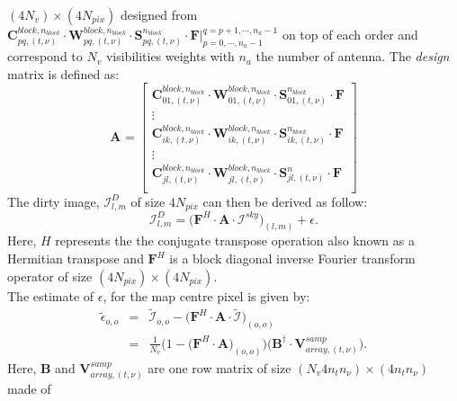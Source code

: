 \documentclass[useAMS,usenatbib]{mn2e}
\begin{document}
$(4N_v)\times (4N_{pix})$ designed from $\mathbf{C}_{pq,(t,\nu)}^{block,n_{block}}\cdot \mathbf{W}_{pq,(t,\nu)}^{block,n_{block}}\cdot 
\mathbf{S}_{pq,(t,\nu)}^{n_{block}}\cdot\mathbf{F}\Big|_{p=0,\cdots,n_{a}-1}^{q=p+1,\cdots,n_{a}-1}$ on top of each order and correspond 
to $N_v$ visibilities weights with $n_a$ the number of antenna. The \textit{design} matrix is defined as:
\begin{equation*}
\mathbf{A}_{}=
  \begin{bmatrix}
    \mathbf{C}_{01,(t,\nu)}^{block,n_{block}}\cdot \mathbf{W}_{01,(t,\nu)}^{block,n_{block}}\cdot \mathbf{S}_{01,(t,\nu)}^{n_{block}} 
\cdot\mathbf{F}\\
    \vdots\\
    \mathbf{C}_{ik,(t,\nu)}^{block,n_{block}}\cdot \mathbf{W}_{ik,(t,\nu)}^{block,n_{block}}\cdot \mathbf{S}_{ik,(t,\nu)}^{n_{block}} 
\cdot\mathbf{F}\\
    \vdots \\
    \mathbf{C}_{jl,(t,\nu)}^{block,n_{block}}\cdot \mathbf{W}_{jl,(t,\nu)}^{block,n_{block}}\cdot \mathbf{S}_{jl,(t,\nu)}^{n} 
\cdot\mathbf{F}\\
  \end{bmatrix}
\end{equation*}
The dirty image, $\mathcal{I}_{l,m}^{D}$ of size $4N_{pix}$ can then be derived as follow:
\begin{equation}
\mathcal{I}_{l,m}^{D}=\bigg(\mathbf{F}^{H}\cdot\mathbf{A}\cdot\mathcal{I}^{sky}\bigg)_{(l,m)} + \epsilon.
\end{equation}
Here, $H$ represents the the conjugate transpose operation also known as a Hermitian transpose and $\mathbf{F}^{H}$ is a block diagonal
inverse Fourier transform operator of size $(4N_{pix})\times(4N_{pix})$.\\ The estimate of  $\epsilon$, for the map centre pixel is given 
by:
\begin{eqnarray}
 \widetilde{\epsilon}_{o,o}&=&\widetilde{\mathcal{I}}_{o,o} - 
\Big(\mathbf{F}^{H}\cdot\mathbf{A}\cdot\widetilde{\mathcal{I}}\Big)_{(o,o)}\\							
&=&\frac{1}{N_{v}}\bigg(1-\Big(\mathbf{F}^{H}\cdot\mathbf{A}\Big)_{(o,o)}\bigg)\bigg(\mathbf{B}^{\dagger}\cdot\mathbf{V}_{array,(t,
\nu)}^{ samp } \bigg)\label{eq:noise1}.
\end{eqnarray}
Here, $\mathbf{B}$ and $\mathbf{V}_{array,(t,\nu)}^{samp}$ are  one row matrix of size $(N_v 4 n_t n_{\nu})\times (4 n_t n_{\nu})$ made of 
\end{document}
